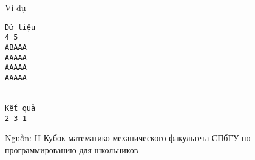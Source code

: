 Ví dụ
\begin{verbatim}
Dữ liệu
4 5
АВААА
ААААА
ААААА
ААААА


Kết quả
2 3 1
\end{verbatim}

   Nguồn: II Кубок математико-механического факультета СПбГУ по программированию для школьников